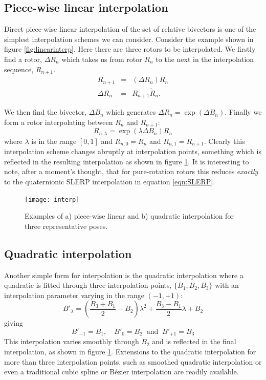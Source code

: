 \subsection{Piece-wise linear interpolation}

Direct piece-wise linear interpolation of the set of relative bivectors is one of the simplest interpolation
schemes we can consider. Consider the example shown in figure \ref{fig:linearinterp}. Here there are
three rotors to be interpolated. We firstly find a rotor, $\Delta R_n$ which takes us from 
rotor $R_n$ to the next in the interpolation sequence, $R_{n+1}$.
\begin{eqnarray*}
R_{n+1} & = & (\Delta R_n) R_n\\
\Delta R_n & = & R_{n+1} \tilde{R}_n.
\end{eqnarray*}

We then find the bivector, $\Delta B_n$ which generates $\Delta R_n = \exp(\Delta B_n)$. Finally we
form a rotor interpolating between $R_n$  and $R_{n+1}$:
\[
R_{n,\lambda} = \exp(\lambda \Delta B_n)R_n
\]
where $\lambda$ is in the range $[0,1]$ and $R_{n,0} = R_n$ and $R_{n,1} = R_{n+1}$.
Clearly this interpolation scheme changes abruptly at interpolation points, something which is
reflected in the resulting interpolation as shown in figure \ref{fig:interp}. 
It is interesting to note, after a moment's thought, that for pure-rotation
rotors this reduces \emph{exactly} to the quaternionic SLERP interpolation
in equation \ref{eqn:SLERP}.

\begin{figure}[t]\centering
\texttt{[image: interp]}
\caption{\label{fig:interp}Examples of a) piece-wise linear and b) quadratic interpolation for
three representative poses.}
\end{figure}

\subsection{Quadratic interpolation}

Another simple form for interpolation is the quadratic interpolation where a quadratic 
is fitted through three interpolation points, $\{B_1, B_2, B_3\}$ with an interpolation
parameter varying in the range $(-1,+1)$:
\[
B'_\lambda = \left(\frac{B_3 + B_1}{2} - B_2\right)\lambda^2 + \frac{B_3 - B_1}{2}\lambda + B_2
\]
giving
\[
B'_{-1} = B_1,\quad B'_{0}=B_2\ \mbox{ and }\ B'_{+1} = B_3
\]
This interpolation varies smoothly through $B_2$ and is reflected in the final
interpolation, as shown in figure \ref{fig:interp}. Extensions to the quadratic
interpolation for more than three interpolation points, such as smoothed
quadratic interpolation \cite{cendes} or even a traditional
cubic spline or B\'ezier interpolation are readily available.


